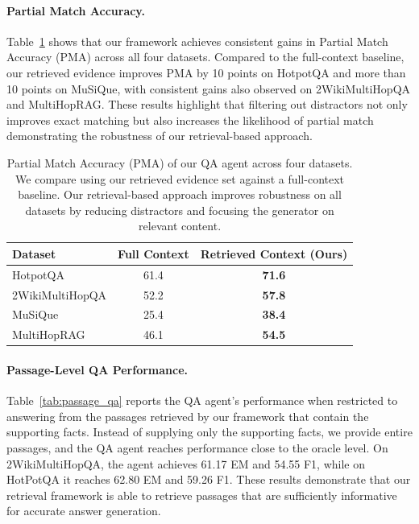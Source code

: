 \documentclass{article} %
\begin{document}

\paragraph{Partial Match Accuracy.} 

Table~\ref{tab:pma} shows that our framework achieves consistent gains in Partial Match Accuracy (PMA) across all four datasets. Compared to the full-context baseline, our retrieved evidence improves PMA by 10 points on HotpotQA and more than 10 points on MuSiQue, with consistent gains also observed on 2WikiMultiHopQA and MultiHopRAG.   
These results highlight that filtering out distractors not only improves exact matching but also increases the likelihood of partial match demonstrating the robustness of our retrieval-based approach.
\begin{table}[h]
\centering
\small
\setlength{\tabcolsep}{4pt} %
\caption{ Partial Match Accuracy (PMA) of our QA agent across four datasets. 
We compare using our retrieved evidence set against a full-context baseline. Our retrieval-based approach improves robustness on all datasets by reducing distractors and focusing the generator on relevant content.}

\begin{tabular}{l|c|c}
\toprule
\textbf{Dataset} & \textbf{Full Context} & \textbf{Retrieved Context (Ours)} \\
\midrule
HotpotQA & 61.4 & \textbf{71.6} \\
\midrule
2WikiMultiHopQA & 52.2 & \textbf{57.8} \\
\midrule
MuSiQue & 25.4 & \textbf{38.4} \\
\midrule
MultiHopRAG & 46.1 & \textbf{54.5} \\
\bottomrule
\end{tabular}
\label{tab:pma}
\end{table}
\paragraph{Passage-Level QA Performance.} 
Table~\ref{tab:passage_qa} reports the QA agent’s performance when restricted to answering from the passages retrieved by our framework that contain the supporting facts. Instead of supplying only the supporting facts, we provide entire passages, and the QA agent reaches performance close to the oracle level.
On {2WikiMultiHopQA}, the agent achieves 61.17 EM and 54.55 F1, while on {HotPotQA} it reaches 62.80 EM and 59.26 F1. 
These results demonstrate that our retrieval framework is able to retrieve passages that are sufficiently informative for accurate answer generation. 
\end{document}
